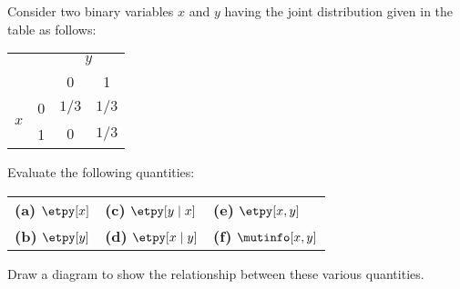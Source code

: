 \begin{question}{1.39}
	Consider two binary variables $x$ and $y$ having the joint distribution given in the table as follows:
	\begin{table*}[h]
		\centering
		\begin{tabular}{cc|cc}
			\multicolumn{2}{c}{} & \multicolumn{2}{c}{$y$}\\
			&  & 0 & 1\\ \cline{2-4}
			\multirow{2}{*}{$x$} & 0 & $1/3$ & $1/3$\\
			& 1 & $0$ & $1/3$
		\end{tabular}
	\end{table*}

	\noindent Evaluate the following quantities:
	
	\begin{table*}[h]
		\centering
		\begin{tabular}{l@{\hskip 0.3\linewidth}l@{\hskip 0.3\linewidth}l}
			{\textbf{(a)} $\etpy[x]$} & {\textbf{(c)} $\etpy[y \mid x]$} & {\textbf{(e)} $\etpy[x, y]$}\\ [0.5em]
			
			{\textbf{(b)} $\etpy[y]$} & {\textbf{(d)} $\etpy[x \mid y]$} & {\textbf{(f)} $\mutinfo[x, y]$}
		\end{tabular}
	\end{table*}

	\noindent Draw a diagram to show the relationship between these various quantities.
\end{question}

